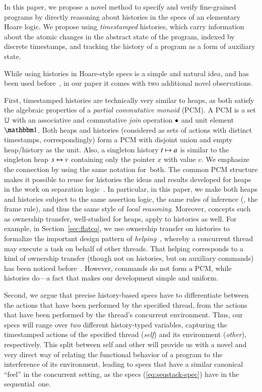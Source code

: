 In this paper, we propose a novel method to specify and verify
fine-grained programs by directly reasoning about histories in the
specs of an elementary Hoare logic. We propose using
\emph{timestamped} histories, which carry information about the atomic
changes in the abstract state of the program, indexed by discrete
timestamps, and tracking the history of a program as a form of
auxiliary state.

While using histories in Hoare-style specs is a simple and natural
idea, and has been used
before~\cite{Bell-al:SAS10,Fu-al:CONCUR10,Gotsman-al:ESOP13}, in our
paper it comes with two additional novel observations.

First, timestamped histories are technically very similar to heaps, as
both satisfy the algebraic properties of a \emph{partial commutative
  monoid} (PCM). A PCM is a set $\mathbb{U}$ with an associative and
commutative \emph{join} operation $\bullet$ and unit element
$\pcmU$. Both heaps and histories (considered as sets of actions with
distinct timestamps, correspondingly) form a PCM with disjoint union
and empty heap/history as the unit. Also, a singleton history $t \mapsto
a$ is similar to the singleton heap $x \mapsto v$ containing only the
pointer $x$ with value $v$.
%
We emphasize the connection by using the same notation for~both.
%
The common PCM structure makes it possible to reuse for histories the
ideas and results developed for heaps in the work on separation
logic~\cite{Calcagno-al:LICS07}. In particular, in this paper, we make
both heaps and histories subject to the same assertion logic, the same
rules of inference (\eg, the frame rule), and thus the same style of
\emph{local reasoning}. Moreover, concepts such as ownership transfer,
well-studied for heaps, apply to histories as well. For example, in
Section~\ref{sec:flatco}, we use ownership transfer on histories to
formalize the important design pattern of
\emph{helping}~\cite{Hendler-al:SPAA10}, whereby a concurrent thread
may execute a task on behalf of other threads. That helping
corresponds to a kind of ownership transfer (though not on histories,
but on auxiliary commands) has been noticed
before~\cite{Turon-al:POPL13,Liang-Feng:PLDI13}.  However, commands
do not form a PCM, while histories do---a fact that makes our
development simple and uniform.

Second, we argue that precise history-based specs have to
differentiate between the actions that have been performed by the
specified thread, from the actions that have been performed by the
thread's concurrent environment. Thus, our specs will range over
\emph{two} different history-typed variables, capturing the
timestamped actions of the specified thread (\emph{self}) and its
environment (\emph{other}), respectively. This split between self and
other will provide us with a novel and very direct way of relating the
functional behavior of a program to the interference of its
environment, leading to specs that have a similar canonical ``feel''
in the concurrent setting, as the specs (\ref{eq:seqstack-spec}) have
in the sequential~one.

